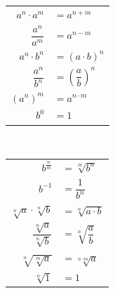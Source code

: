 \documentclass[a4paper, fontsize = 8pt, landscape]{scrartcl}
\begin{document}
\begin{multicols*}{3}
    \begin{center}
        \begin{minipage}{0.48\linewidth}
            \begin{center}
                \renewcommand{\arraystretch}{1.35}
                \begin{tabular}{r l}
                    $a^n \cdot a^m$    & \hspace*{-10pt}$= a^{n + m}$
                    \\
                    $\dfrac{a^n}{a^m}$ & \hspace*{-10pt}$= a^{n - m}$                   \\
                    $a^n \cdot b^n$    & \hspace*{-10pt}$= (a \cdot b)^n$               \\
                    $\dfrac{a^n}{b^n}$ & \hspace*{-10pt}$= \left(\dfrac{a}{b}\right)^n$ \\
                    $(a^n)^m$          & \hspace*{-10pt}$= a^{n \cdot m}$               \\
                    $b^0$              & \hspace*{-10pt}$= 1$                           \\
                \end{tabular}
            \end{center}
        \end{minipage}
        \,\vline\,
        \begin{minipage}{0.48\linewidth}
            \begin{center}
                \renewcommand{\arraystretch}{1.35}
                \begin{tabular}{r l}
                    $b^{\frac{n}{m}}$                  & \hspace*{-10pt}$= \sqrt[m]{b^n}$          \\
                    $b^{-1}$                           & \hspace*{-10pt}$= \dfrac{1}{b^n}$         \\
                    $\sqrt[n]{a} \cdot \sqrt[n]{b}$    & \hspace*{-10pt}$= \sqrt[n]{a \cdot b}$
                    \\
                    $\dfrac{\sqrt[n]{a}}{\sqrt[n]{b}}$ & \hspace*{-10pt}$= \sqrt[n]{\dfrac{a}{b}}$ \\
                    $\sqrt[n]{\sqrt[m]{a}}$            & \hspace*{-10pt}$= \sqrt[n \cdot m]{a}$    \\
                    $\sqrt[n]{1}$                      & \hspace*{-10pt}$= 1$                      \\
                \end{tabular}
            \end{center}
        \end{minipage}
    \end{center}


\end{multicols*}
\end{document}
